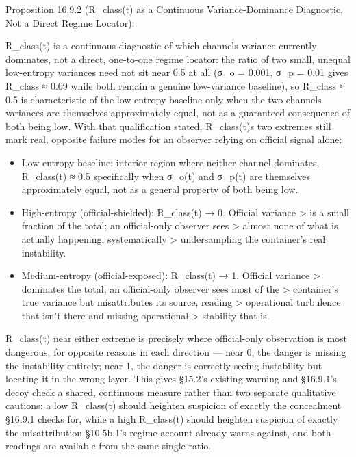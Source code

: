 \documentclass[
]{article}
\begin{document}
Proposition 16.9.2 (R\_class(t) as a Continuous Variance-Dominance
Diagnostic, Not a Direct Regime Locator).

R\_class(t) is a continuous diagnostic of which channels variance
currently dominates, not a direct, one-to-one regime locator: the ratio
of two small, unequal low-entropy variances need not sit near 0.5 at all
(σ\_o = 0.001, σ\_p = 0.01 gives R\_class ≈ 0.09 while both remain a
genuine low-variance baseline), so R\_class ≈ 0.5 is characteristic of
the low-entropy baseline only when the two channels variances are
themselves approximately equal, not as a guaranteed consequence of both
being low. With that qualification stated, R\_class(t)s two extremes
still mark real, opposite failure modes for an observer relying on
official signal alone:

\begin{itemize}
\item
  Low-entropy baseline: interior region where neither channel dominates,
  R\_class(t) ≈ 0.5 specifically when σ\_o(t) and σ\_p(t) are themselves
  approximately equal, not as a general property of both being low.
\item
  High-entropy (official-shielded): R\_class(t) → 0. Official variance
  \textgreater{} is a small fraction of the total; an official-only
  observer sees \textgreater{} almost none of what is actually
  happening, systematically \textgreater{} undersampling the container's
  real instability.
\item
  Medium-entropy (official-exposed): R\_class(t) → 1. Official variance
  \textgreater{} dominates the total; an official-only observer sees
  most of the \textgreater{} container's true variance but misattributes
  its source, reading \textgreater{} operational turbulence that isn't
  there and missing operational \textgreater{} stability that is.
\end{itemize}

R\_class(t) near either extreme is precisely where official-only
observation is most dangerous, for opposite reasons in each direction
--- near 0, the danger is missing the instability entirely; near 1, the
danger is correctly seeing instability but locating it in the wrong
layer. This gives §15.2's existing warning and §16.9.1's decoy check a
shared, continuous measure rather than two separate qualitative
cautions: a low R\_class(t) should heighten suspicion of exactly the
concealment §16.9.1 checks for, while a high R\_class(t) should heighten
suspicion of exactly the misattribution §10.5b.1's regime account
already warns against, and both readings are available from the same
single ratio.
\end{document}
